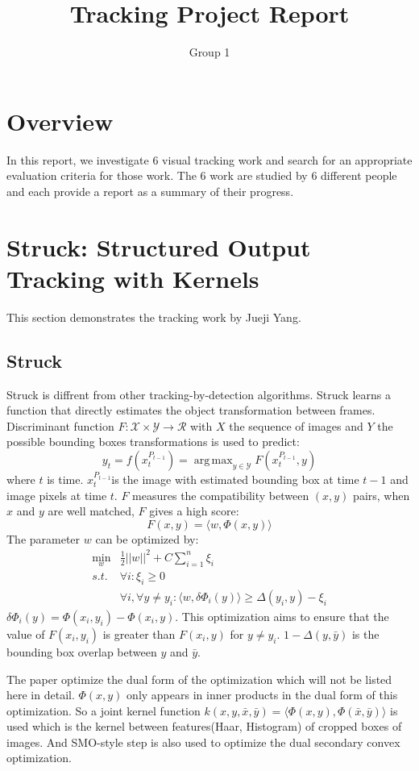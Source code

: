 \documentclass{article}
\title{Tracking Project Report}
\author{Group 1}
\DeclareMathOperator*{\argmax}{arg\,max}
\DeclareMathOperator*{\minbelow}{min}
\begin{document}
\maketitle
\section{Overview}

In this report, we investigate 6 visual tracking work and search for an appropriate evaluation criteria for those work. The 6 work are studied by 6 different people and each provide a report as a summary of their progress.
\section{ Struck: Structured Output Tracking with Kernels}
This section demonstrates the tracking work by Jueji Yang.
\subsection{Struck}
Struck\cite{struck} is diffrent from other tracking-by-detection algorithms. Struck learns a function that directly estimates the object transformation between frames. Discriminant function $F:\mathcal{X} \times \mathcal{Y} \to \mathcal{R}$ with $X$ the sequence of images and $Y$ the possible bounding boxes transformations is used to predict:
\[
y_t = f(x_t^{P_{t-1}}) = \argmax_{y\in \mathcal{Y}}F(x_t^{P_{t-1}},y)
\]
where $t$ is time. $x_t^{P_{t-1}}$is the image with estimated bounding box at time $t-1$ and image pixels at time $t$. $F$ measures the compatibility between $(x,y)$ pairs, when $x$ and $y$ are well matched, $F$ gives a high score:
\[
F(x,y)=\langle w, \Phi(x,y) \rangle
\]
The parameter $w$ can be optimized by:
\begin{align}
\minbelow_w	&\frac{1}{2}||w||^2 + C \sum_{i=1}^n\xi_i\nonumber\\
	s.t.	&\forall i: \xi_i \ge 0\nonumber\\
			&\forall i, \forall y\not= y_i : \langle w, \delta\Phi_i(y)\rangle \ge \Delta(y_i,y)-\xi_i
\end{align}
$\delta\Phi_i(y)=\Phi(x_i, y_i) - \Phi(x_i, y)$. This optimization aims to ensure that the value of $F(x_i, y_i)$ is greater than $F(x_i, y)$ for $y\not= y_i$. $1-\Delta(y,\bar{y})$ is the bounding box overlap between $y$ and $\bar{y}$.

The paper optimize the dual form of the optimization which will not be listed here in detail. $\Phi(x,y)$ only appears in inner products in the dual form of this optimization. So a joint kernel function $k(x,y,\bar{x},\bar{y}) = \langle \Phi(x,y), \Phi(\bar{x},\bar{y})\rangle$ is used which is the kernel between features(Haar, Histogram) of cropped boxes of images. And SMO-style step is also used to optimize the dual secondary convex optimization.
\end{document}
